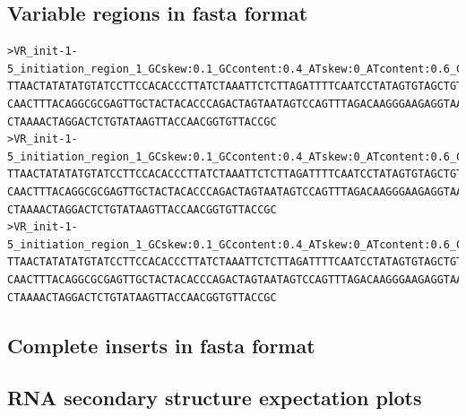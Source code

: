 \documentclass[11pt]{article}
\begin{document}
\subsection{Variable regions in fasta format}

\begin{verbatim}
>VR_init-1-5_initiation_region_1_GCskew:0.1_GCcontent:0.4_ATskew:0_ATcontent:0.6_Clustered:False
TTAACTATATATGTATCCTTCCACACCCTTATCTAAATTCTCTTAGATTTTCAATCCTATAGTGTAGCTGTGGCAGATG
CAACTTTACAGGCGCGAGTTGCTACTACACCCAGACTAGTAATAGTCCAGTTTAGACAAGGGAAGAGGTAAATCGTCTA
CTAAAACTAGGACTCTGTATAAGTTACCAACGGTGTTACCGC
>VR_init-1-5_initiation_region_1_GCskew:0.1_GCcontent:0.4_ATskew:0_ATcontent:0.6_Clustered:False
TTAACTATATATGTATCCTTCCACACCCTTATCTAAATTCTCTTAGATTTTCAATCCTATAGTGTAGCTGTGGCAGATG
CAACTTTACAGGCGCGAGTTGCTACTACACCCAGACTAGTAATAGTCCAGTTTAGACAAGGGAAGAGGTAAATCGTCTA
CTAAAACTAGGACTCTGTATAAGTTACCAACGGTGTTACCGC
>VR_init-1-5_initiation_region_1_GCskew:0.1_GCcontent:0.4_ATskew:0_ATcontent:0.6_Clustered:False
TTAACTATATATGTATCCTTCCACACCCTTATCTAAATTCTCTTAGATTTTCAATCCTATAGTGTAGCTGTGGCAGATG
CAACTTTACAGGCGCGAGTTGCTACTACACCCAGACTAGTAATAGTCCAGTTTAGACAAGGGAAGAGGTAAATCGTCTA
CTAAAACTAGGACTCTGTATAAGTTACCAACGGTGTTACCGC
\end{verbatim}

\subsection{Complete inserts in fasta format}


\subsection{RNA secondary structure expectation plots}




\pagebreak


\end{document}
